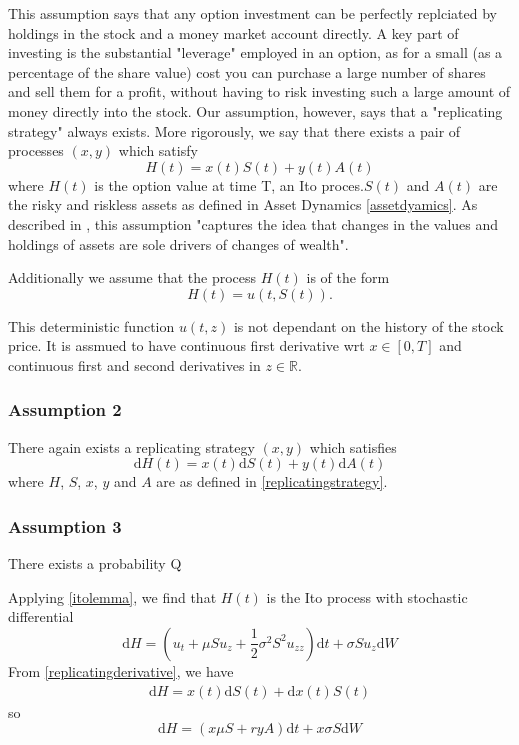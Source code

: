 \documentclass[11pt]{article} %
\begin{document}
This assumption says that any option investment can be perfectly replciated by holdings in 
the stock and a money market account directly. A key part of investing is the substantial 
"leverage" employed in an option, as for a small (as a percentage of the share value) cost 
you can purchase a large number of shares and sell them for a profit, without having to risk 
investing such a large amount of money directly into the stock. Our assumption, however, says 
that a "replicating strategy" always exists. More rigorously, we say that there exists a 
pair of processes $(x,y)$ which satisfy 
\begin{equation}
    H(t) = x(t)S(t) + y(t)A(t)
\end{equation}
where $H(t)$ is the option value at time T, an Ito proces.$S(t)$ and $A(t)$ are the risky 
and riskless assets as defined in Asset Dynamics \ref{assetdyamics}. 
As described in \cite{blackscholes}, this assumption "captures the idea that changes in the 
values and holdings of assets are sole drivers of changes of wealth".

Additionally we assume that the process $H(t)$ is of  the form 
\begin{equation}
    H(t) = u(t, S(t)).
\end{equation}

This deterministic function $u(t,z)$ is not dependant on the history of the stock price. 
It is assmued to have continuous first derivative wrt $x \in [0,T]$ and continuous first 
and second derivatives in $z \in \mathbb{R}$.

\subsubsection{Assumption 2}
There again exists a replicating strategy $(x,y)$ which satisfies 
\begin{equation}\label{replicatingderivative}
    \mathrm{d} H(t) = x(t)\mathrm{d} S(t) + y(t)\mathrm{d} A(t)
\end{equation}
where $H$, $S$, $x$, $y$ and $A$ are as defined in \ref{replicatingstrategy}.
\subsubsection{Assumption 3}
There exists a probability Q


Applying \ref{itolemma}, we find that $H(t)$ is the Ito process with stochastic differential 
\begin{equation}\label{itoformulasolve}
    \mathrm{d}H = (u_t + \mu S u_z + \frac{1}{2} \sigma^2 S^2 u_{zz})\mathrm{d}t + 
    \sigma S u_z \mathrm{d}W
\end{equation}
From \ref{replicatingderivative}, we have
\begin{align}
    \mathrm{d}H = x(t)\mathrm{d}S(t) +\mathrm{d}x(t)S(t) 
\end{align}
so
\begin{equation}\label{financingcondition}
    \mathrm{d}H = (x\mu S + ryA)\mathrm{d}t + x \sigma S \mathrm{d}W 
\end{equation}
\end{document}
